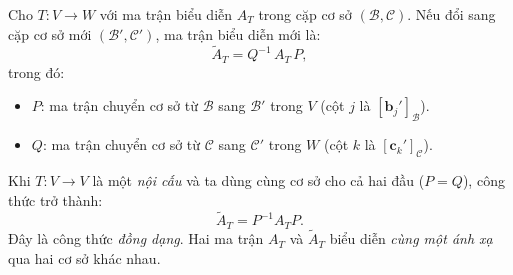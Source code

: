 \documentclass[12pt,a4paper]{article}
\begin{document}
\begin{dinhly}[title={Công thức đổi ma trận biểu diễn}]
Cho $T: V \to W$ với ma trận biểu diễn $A_T$ trong cặp cơ sở $(\mathcal{B}, \mathcal{C})$. Nếu đổi sang cặp cơ sở mới $(\mathcal{B}', \mathcal{C}')$, ma trận biểu diễn mới là:
\[
  \widetilde{A}_T = Q^{-1}\, A_T\, P,
\]
trong đó:
\begin{itemize}
  \item $P$: ma trận chuyển cơ sở từ $\mathcal{B}$ sang $\mathcal{B}'$ trong $V$ (cột $j$ là $[\mathbf{b}_j']_{\mathcal{B}}$).
  \item $Q$: ma trận chuyển cơ sở từ $\mathcal{C}$ sang $\mathcal{C}'$ trong $W$ (cột $k$ là $[\mathbf{c}_k']_{\mathcal{C}}$).
\end{itemize}
\end{dinhly}

\begin{luuy}[title={Trường hợp đặc biệt: $V = W$, $\mathcal{B} = \mathcal{C}$}]
Khi $T: V \to V$ là một \emph{nội cấu} và ta dùng cùng cơ sở cho cả hai đầu ($P = Q$), công thức trở thành:
\[
  \widetilde{A}_T = P^{-1} A_T P.
\]
Đây là công thức \emph{đồng dạng}. Hai ma trận $A_T$ và $\widetilde{A}_T$ biểu diễn \emph{cùng một ánh xạ} qua hai cơ sở khác nhau.
\end{luuy}
\end{document}
